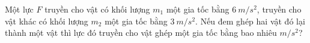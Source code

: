 \begin{vidu}
Một lực ${F}$ truyền cho vật có khối lượng ${m}_1$ một gia tốc bằng $6\ m/s^2$, truyền cho vật khác có khối lượng ${m}_2$ một gia tốc bằng $3\ m/s^2$. Nếu đem ghép hai vật đó lại thành một vật thì lực đó truyền cho vật ghép một gia tốc bằng bao nhiêu $m/s^2$?
  \end{vidu}
